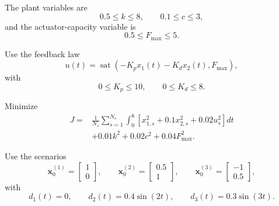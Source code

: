 The plant variables are
\begin{equation}
0.5\leq k\leq 8,
\qquad
0.1\leq c\leq 3,
\end{equation}
and the actuator-capacity variable is
\begin{equation}
0.5\leq F_{\max}\leq 5.
\end{equation}

Use the feedback law
\begin{equation}
u(t)=
\operatorname{sat}
\left(
-K_px_1(t)-K_dx_2(t),
F_{\max}
\right),
\end{equation}
with
\begin{equation}
0\leq K_p\leq 10,
\qquad
0\leq K_d\leq 8.
\end{equation}

Minimize
\begin{align}
J=&
\frac{1}{N_s}
\sum_{s=1}^{N_s}
\int_0^8
\left[
x_{1,s}^2
+0.1x_{2,s}^2
+0.02u_s^2
\right]dt
\nonumber\\
&+
0.01k^2
+
0.02c^2
+
0.04F_{\max}^2.
\end{align}

Use the scenarios
\begin{equation}
\mathbf{x}_0^{(1)}=
\begin{bmatrix}
1\\
0
\end{bmatrix},
\qquad
\mathbf{x}_0^{(2)}=
\begin{bmatrix}
0.5\\
1
\end{bmatrix},
\qquad
\mathbf{x}_0^{(3)}=
\begin{bmatrix}
-1\\
0.5
\end{bmatrix},
\end{equation}
with
\begin{equation}
d_1(t)=0,
\qquad
d_2(t)=0.4\sin(2t),
\qquad
d_3(t)=0.3\sin(3t).
\end{equation}

